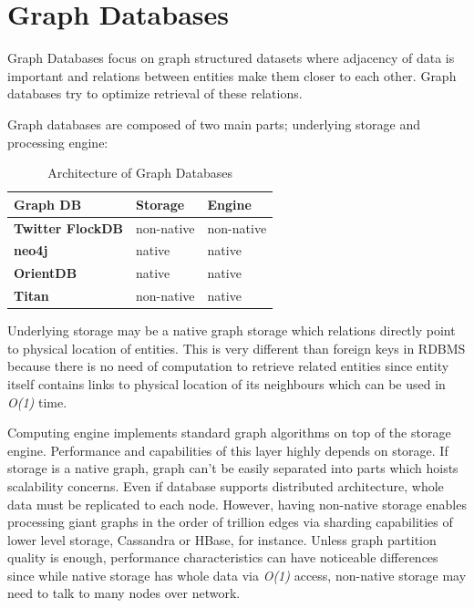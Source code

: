 \section{Graph Databases}

Graph Databases focus on graph structured datasets where adjacency of data is important and relations between entities make them closer to each other.
Graph databases try to optimize retrieval of these relations.

Graph databases are composed of two main parts; underlying storage and processing engine:

\begin{table}[H]
  \centering
  \caption{Architecture of Graph Databases}
  \renewcommand{\arraystretch}{1.5}
  \begin{tabular}{| >{\centering\bfseries}m{2in} | >{\centering}m{1in} | >{\centering\arraybackslash}m{1in} |}
	\hline
    \textbf{Graph DB} & \textbf{Storage} & \textbf{Engine} \\ \hline
	Twitter FlockDB & non-native & non-native \\ \hline
	neo4j & native & native \\ \hline
	OrientDB & native & native \\ \hline
	Titan & non-native & native \\ \hline
  \end{tabular}
  \label{orientdb}
\end{table}

Underlying storage may be a native graph storage which relations directly point to physical location of entities. This is very different than foreign keys in RDBMS because there is no need of computation to retrieve related entities since entity itself contains links to physical location of its neighbours which can be used in \textit{O(1)} time.

Computing engine implements standard graph algorithms on top of the storage engine. Performance and capabilities of this layer highly depends on storage. If storage is a native graph, graph can't be easily separated into parts which hoists scalability concerns. Even if database supports distributed architecture, whole data must be replicated to each node. However, having non-native storage enables processing giant graphs in the order of trillion edges via sharding capabilities of lower level storage, Cassandra or HBase, for instance. Unless graph partition quality is enough, performance characteristics can have noticeable differences since while native storage has whole data via \textit{O(1)} access, non-native storage may need to talk to many nodes over network.

